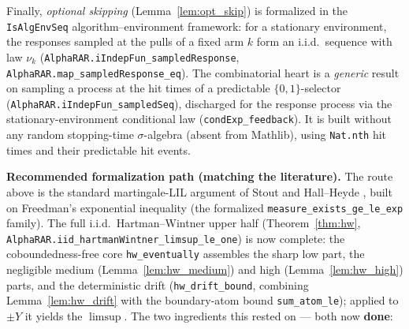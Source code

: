 Finally, \emph{optional skipping} (Lemma~\ref{lem:opt_skip}) is formalized in the
\texttt{IsAlgEnvSeq} algorithm--environment framework: for a stationary environment, the responses
sampled at the pulls of a fixed arm $k$ form an i.i.d.\ sequence with law $\nu_k$
(\texttt{AlphaRAR.iIndepFun\_sampledResponse}, \texttt{AlphaRAR.map\_sampledResponse\_eq}). The
combinatorial heart is a \emph{generic} result on sampling a process at the hit times of a
predictable $\{0,1\}$-selector (\texttt{AlphaRAR.iIndepFun\_sampledSeq}), discharged for the response
process via the stationary-environment conditional law (\texttt{condExp\_feedback}). It is built
without any random stopping-time $\sigma$-algebra (absent from Mathlib), using \texttt{Nat.nth} hit
times and their predictable hit events.

\medskip
\noindent\textbf{Recommended formalization path (matching the literature).} The route above is the
standard martingale-LIL argument of Stout \cite{Stout1970} and Hall--Heyde \cite{HallHeyde1980},
built on Freedman's exponential inequality \cite{Freedman1975} (the formalized
\texttt{measure\_exists\_ge\_le\_exp} family). The full i.i.d.\ Hartman--Wintner upper half
(Theorem~\ref{thm:hw}, \texttt{AlphaRAR.iid\_hartmanWintner\_limsup\_le\_one}) is now complete:
the coboundedness-free core \texttt{hw\_eventually} assembles the sharp low part, the negligible
medium (Lemma~\ref{lem:hw_medium}) and high (Lemma~\ref{lem:hw_high}) parts, and the deterministic
drift (\texttt{hw\_drift\_bound}, combining Lemma~\ref{lem:hw_drift} with the boundary-atom bound
\texttt{sum\_atom\_le}); applied to $\pm Y$ it yields the $\limsup$. The two ingredients this rested
on --- both now \textbf{done}:
